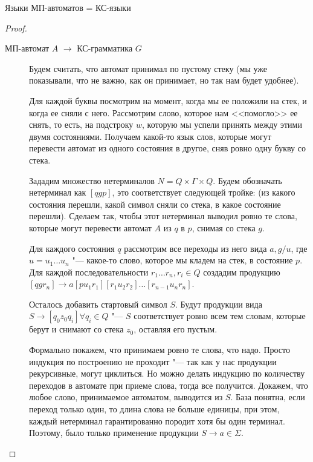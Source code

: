 
\begin{theorem}
    Языки МП-автоматов = КС-языки
\end{theorem}
\begin{proof}
\begin{description}
    \item[МП-автомат $A$ $\to$ КС-грамматика $G$]

    Будем считать, что автомат принимал по пустому стеку (мы уже показывали, что не важно, как он принимает, но так нам будет удобнее).

    Для каждой буквы посмотрим на момент, когда мы ее положили на стек, и когда ее сняли с него. 
    Рассмотрим слово, которое нам <<помогло>> ее снять, то есть, на подстроку $w$, которую мы успели принять между этими двумя состояниями.
    Получаем какой-то язык слов, которые могут перевести автомат из одного состояния в другое, сняв ровно одну букву со стека.
    
    Зададим множество нетерминалов $N = Q \times \Gamma \times Q$.
    Будем обозначать нетерминал как $[qgp]$, это соответствует следующей тройке: (из какого состояния перешли, какой символ сняли со стека, в какое состояние перешли).
    Сделаем так, чтобы этот нетерминал выводил ровно те слова, которые могут перевести автомат $A$ из $q$ в $p$, снимая со стека $g$.

    Для каждого состояния $q$ рассмотрим все переходы из него вида $a, g/u$, где $u=u_1\dots u_n$ "--- какое-то слово, которое мы кладем на стек, в состояние $p$.
    Для каждой последовательности $r_1 \dots r_n, r_i \in Q$ создадим продукцию $[q g r_n] \to a[p u_1 r_1][r_1 u_2 r_2]\dots [r_{n-1} u_n r_n]$.

    Осталось добавить стартовый символ $S$. 
    Будут продукции вида $S \to [q_0z_0q_i] \forall q_i \in Q$ "--- $S$ соответствует ровно всем тем словам, которые берут и снимают со стека $z_0$, оставляя его пустым.

    Формально покажем, что принимаем ровно те слова, что надо. Просто индукция по построению не проходит "--- так как у нас продукции рекурсивные, могут циклиться.
    Но можно делать индукцию по количеству переходов в автомате при приеме слова, тогда все получится.
    Докажем, что любое слово, принимаемое автоматом, выводится из $S$.
    База понятна, если переход только один, то длина слова не больше единицы, при этом, каждый нетерминал гарантированно породит хотя бы один терминал. 
    Поэтому, было только применение продукции $S \to a \in \Sigma$. 


\end{description}
\end{proof}
